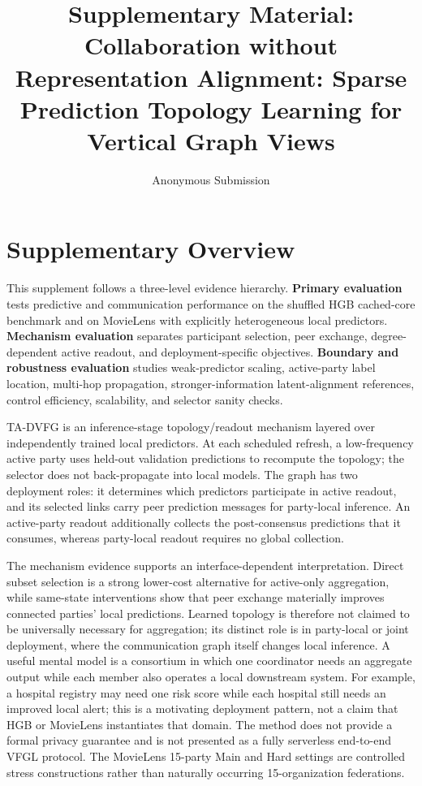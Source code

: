 \documentclass[letterpaper]{article}
\title{Supplementary Material: Collaboration without Representation Alignment: Sparse Prediction Topology Learning for Vertical Graph Views}
\author{Anonymous Submission}
\newcommand{\method}{\textsc{TA-DVFG}}
\begin{document}
\maketitle

\renewcommand{\thetable}{S\arabic{table}}
\renewcommand{\thefigure}{S\arabic{figure}}
\renewcommand{\theequation}{S\arabic{equation}}
\renewcommand{\thealgorithm}{S\arabic{algorithm}}
\renewcommand{\theproposition}{S\arabic{proposition}}

\section{Supplementary Overview}

This supplement follows a three-level evidence hierarchy. \textbf{Primary
evaluation} tests predictive and communication performance on the shuffled HGB
cached-core benchmark and on MovieLens with explicitly heterogeneous local
predictors. \textbf{Mechanism evaluation} separates participant selection,
peer exchange, degree-dependent active readout, and deployment-specific
objectives. \textbf{Boundary and robustness evaluation} studies weak-predictor
scaling, active-party label location, multi-hop propagation,
stronger-information latent-alignment references, control efficiency,
scalability, and selector sanity checks.

\method{} is an inference-stage topology/readout mechanism layered over
independently trained local predictors. At each scheduled refresh, a
low-frequency active party uses held-out validation predictions to recompute the
topology; the selector does not back-propagate into local models. The graph has
two deployment roles: it determines which predictors participate in active
readout, and its selected links carry peer prediction messages for party-local
inference. An active-party readout additionally collects the post-consensus
predictions that it consumes, whereas party-local readout requires no global
collection.

The mechanism evidence supports an interface-dependent interpretation. Direct
subset selection is a strong lower-cost alternative for active-only
aggregation, while same-state interventions show that peer exchange materially
improves connected parties' local predictions. Learned topology is therefore
not claimed to be universally necessary for aggregation; its distinct role is
in party-local or joint deployment, where the communication graph itself
changes local inference. A useful mental model is a consortium in which one
coordinator needs an aggregate output while each member also operates a local
downstream system. For example, a hospital registry may need one risk score
while each hospital still needs an improved local alert; this is a motivating
deployment pattern, not a claim that HGB or MovieLens instantiates that domain.
The method does not provide a formal privacy guarantee
and is not presented as a fully serverless end-to-end VFGL protocol. The
MovieLens 15-party Main and Hard settings are controlled stress constructions
rather than naturally occurring 15-organization federations.
\end{document}
